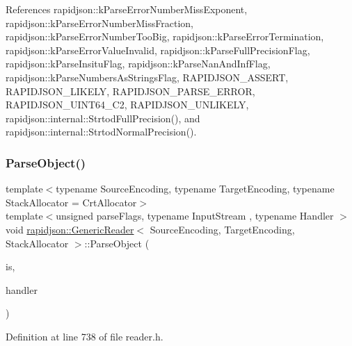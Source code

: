 References rapidjson\+::k\+Parse\+Error\+Number\+Miss\+Exponent, rapidjson\+::k\+Parse\+Error\+Number\+Miss\+Fraction, rapidjson\+::k\+Parse\+Error\+Number\+Too\+Big, rapidjson\+::k\+Parse\+Error\+Termination, rapidjson\+::k\+Parse\+Error\+Value\+Invalid, rapidjson\+::k\+Parse\+Full\+Precision\+Flag, rapidjson\+::k\+Parse\+Insitu\+Flag, rapidjson\+::k\+Parse\+Nan\+And\+Inf\+Flag, rapidjson\+::k\+Parse\+Numbers\+As\+Strings\+Flag, R\+A\+P\+I\+D\+J\+S\+O\+N\+\_\+\+A\+S\+S\+E\+RT, R\+A\+P\+I\+D\+J\+S\+O\+N\+\_\+\+L\+I\+K\+E\+LY, R\+A\+P\+I\+D\+J\+S\+O\+N\+\_\+\+P\+A\+R\+S\+E\+\_\+\+E\+R\+R\+OR, R\+A\+P\+I\+D\+J\+S\+O\+N\+\_\+\+U\+I\+N\+T64\+\_\+\+C2, R\+A\+P\+I\+D\+J\+S\+O\+N\+\_\+\+U\+N\+L\+I\+K\+E\+LY, rapidjson\+::internal\+::\+Strtod\+Full\+Precision(), and rapidjson\+::internal\+::\+Strtod\+Normal\+Precision().

\mbox{\label{classrapidjson_1_1_generic_reader_a47e01cfe5d49d6ee0da6ee4389626074}} 
\subsubsection{\texorpdfstring{ParseObject()}{ParseObject()}}
{\footnotesize\ttfamily template$<$typename Source\+Encoding, typename Target\+Encoding, typename Stack\+Allocator = Crt\+Allocator$>$ \\
template$<$unsigned parse\+Flags, typename Input\+Stream , typename Handler $>$ \\
void \mbox{\hyperlink{classrapidjson_1_1_generic_reader}{rapidjson\+::\+Generic\+Reader}}$<$ Source\+Encoding, Target\+Encoding, Stack\+Allocator $>$\+::Parse\+Object (\begin{DoxyParamCaption}\item[{Input\+Stream \&}]{is,  }\item[{\mbox{\hyperlink{classrapidjson_1_1_handler}{Handler}} \&}]{handler }\end{DoxyParamCaption})\hspace{0.3cm}{\ttfamily [private]}}



Definition at line 738 of file reader.\+h.


